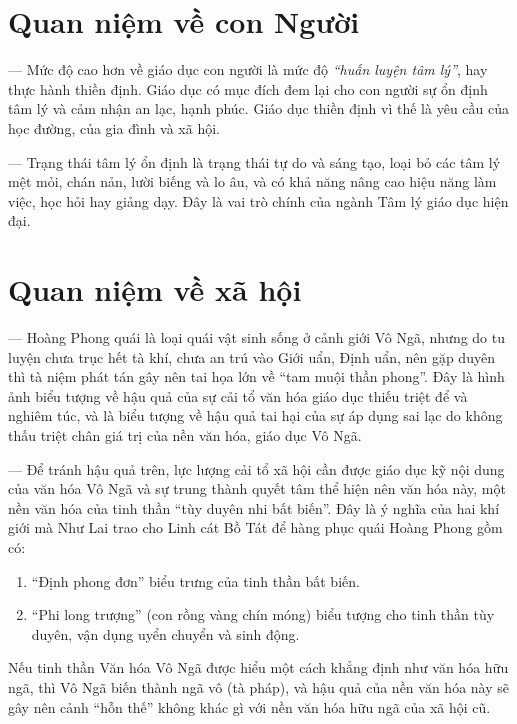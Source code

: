 \section{Quan niệm về con Người} %
\label{sec:20_21_22_con_nguoi}

--- Mức độ cao hơn về giáo dục con người là mức độ \emph{``huấn luyện tâm lý''}, hay thực hành thiền định. Giáo dục có mục đích đem lại cho con người sự ổn định tâm lý và cảm nhận an lạc, hạnh phúc. Giáo dục thiền định vì thế là yêu cầu của học đường, của gia đình và xã hội.

--- Trạng thái tâm lý ổn định là trạng thái tự do và sáng tạo, loại bỏ các tâm lý mệt mỏi, chán nản, lười biếng và lo âu, và có khả năng nâng cao hiệu năng làm việc, học hỏi hay giảng dạy. Đây là vai trò chính của ngành Tâm lý giáo dục hiện đại.

\section{Quan niệm về xã hội} %
\label{sec:20_21_22_xa_hoi}

--- Hoàng Phong quái là loại quái vật sinh sống ở cảnh giới Vô Ngã, nhưng do tu luyện chưa trục hết tà khí, chưa an trú vào Giới uẩn, Định uẩn, nên gặp duyên thì tà niệm phát tán gây nên tai họa lớn về ``tam muội thần phong''. Đây là hình ảnh biểu tượng về hậu quả của sự cải tổ văn hóa giáo dục thiếu triệt để và nghiêm túc, và là biểu tượng về hậu quả tai hại của sự áp dụng sai lạc do không thấu triệt chân giá trị của nền văn hóa, giáo dục Vô Ngã.

--- Để tránh hậu quả trên, lực lượng cải tổ xã hội cần được giáo dục kỹ nội dung của văn hóa Vô Ngã và sự trung thành quyết tâm thể hiện nên văn hóa này, một nền văn hóa của tinh thần ``tùy duyên nhi bất biến''. Đây là ý nghĩa của hai khí giới mà Như Lai trao cho Linh cát Bồ Tát để hàng phục quái Hoàng Phong gồm có:

\begin{enumerate}[label=\itshape\arabic*\upshape/]
   \item ``Định phong đơn'' biểu trưng của tinh thần bất biến.

   \item ``Phi long trượng'' (con rồng vàng chín móng) biểu tượng cho tinh thần tùy duyên, vận dụng uyển chuyển và sinh động.
\end{enumerate}

Nếu tinh thần Văn hóa Vô Ngã được hiểu một cách khẳng định như văn hóa hữu ngã, thì Vô Ngã biến thành ngã vô (tà pháp), và hậu quả của nền văn hóa này sẽ gây nên cảnh ``hỗn thế'' không khác gì với nền văn hóa hữu ngã của xã hội cũ.

